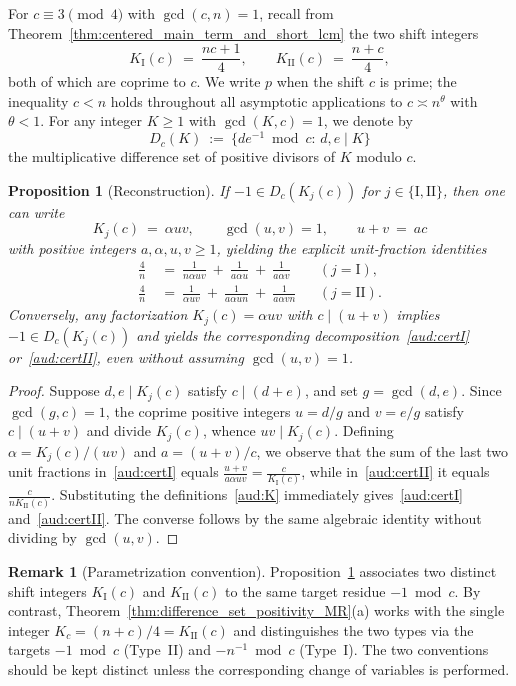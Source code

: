 \documentclass[11pt, a4paper]{article}
\theoremstyle{plain}
\newtheorem{proposition}[theorem]{Proposition}
\theoremstyle{definition}
\newtheorem{remark}[theorem]{Remark}
\newcommand{\I}{\mathrm{I}}
\newcommand{\II}{\mathrm{II}}
\begin{document}
For $c\equiv3\pmod 4$ with $\gcd(c,n)=1$, recall from Theorem~\ref{thm:centered_main_term_and_short_lcm} the two shift integers
\begin{equation}\label{aud:K}
K_{\I}(c)\ =\ \frac{nc+1}{4},\qquad K_{\II}(c)\ =\ \frac{n+c}{4},
\end{equation}
both of which are coprime to $c$. We write $p$ when the shift $c$ is prime; the inequality $c<n$ holds throughout all asymptotic applications to $c\asymp n^{\theta}$ with $\theta<1$. For any integer $K\ge 1$ with $\gcd(K,c)=1$, we denote by
\[
D_c(K)\ :=\ \big\{de^{-1}\bmod c:\,d,e\mid K\big\}
\]
the multiplicative difference set of positive divisors of $K$ modulo $c$.

\begin{proposition}[Reconstruction]\label{aud:reconstruction}
If $-1\in D_c(K_j(c))$ for $j\in\{\I,\II\}$, then one can write
\[
K_j(c)\ =\ \alpha uv,\qquad \gcd(u,v)=1,\qquad u+v\ =\ ac
\]
with positive integers $a,\alpha,u,v\ge1$, yielding the explicit unit-fraction identities
\begin{align}
\frac{4}{n}\ &=\ \frac{1}{n\alpha uv}\ +\ \frac{1}{a\alpha u}\ +\ \frac{1}{a\alpha v} &&(j=\I),\label{aud:certI}\\
\frac{4}{n}\ &=\ \frac{1}{\alpha uv}\ +\ \frac{1}{a\alpha un}\ +\ \frac{1}{a\alpha vn} &&(j=\II).\label{aud:certII}
\end{align}
Conversely, any factorization $K_j(c)=\alpha uv$ with $c\mid(u+v)$ implies $-1\in D_c(K_j(c))$ and yields the corresponding decomposition~\eqref{aud:certI} or~\eqref{aud:certII}, even without assuming $\gcd(u,v)=1$.
\end{proposition}
\begin{proof}
Suppose $d,e\mid K_j(c)$ satisfy $c\mid(d+e)$, and set $g=\gcd(d,e)$. Since $\gcd(g,c)=1$, the coprime positive integers $u=d/g$ and $v=e/g$ satisfy $c\mid(u+v)$ and divide $K_j(c)$, whence $uv\mid K_j(c)$. Defining $\alpha=K_j(c)/(uv)$ and $a=(u+v)/c$, we observe that the sum of the last two unit fractions in~\eqref{aud:certI} equals $\frac{u+v}{a\alpha uv}=\frac{c}{K_{\I}(c)}$, while in~\eqref{aud:certII} it equals $\frac{c}{nK_{\II}(c)}$. Substituting the definitions~\eqref{aud:K} immediately gives~\eqref{aud:certI} and~\eqref{aud:certII}. The converse follows by the same algebraic identity without dividing by $\gcd(u,v)$.
\end{proof}

\begin{remark}[Parametrization convention]
Proposition~\ref{aud:reconstruction} associates two distinct shift integers $K_{\I}(c)$ and $K_{\II}(c)$ to the same target residue $-1\bmod c$. By contrast, Theorem~\ref{thm:difference_set_positivity_MR}(a) works with the single integer $K_c=(n+c)/4=K_{\II}(c)$ and distinguishes the two types via the targets $-1\bmod c$ (Type~II) and $-n^{-1}\bmod c$ (Type~I). The two conventions should be kept distinct unless the corresponding change of variables is performed.
\end{remark}
\end{document}
